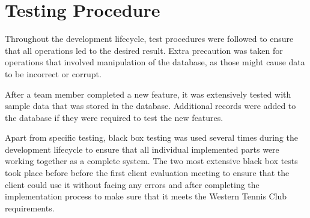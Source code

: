 \documentclass{l3proj}
\begin{document}
\section{Testing Procedure}
Throughout the development lifecycle, test procedures were followed to ensure that all operations led to the desired result. Extra precaution was taken for operations that involved manipulation of the database, as those might cause data to be incorrect or corrupt.\\
\par 
After a team member completed a new feature, it was extensively tested with sample data that was stored in the database. Additional records were added to the database if they were required to test the new features.\\
\par Apart from specific testing, black box testing was used several times during the development lifecycle to ensure that all individual implemented parts were working together as a complete system. The two most extensive black box tests took place before before the first client evaluation meeting to ensure that the client could use it without facing any errors and after completing the implementation process to make sure that it meets the Western Tennis Club requirements. 

\end{document}
